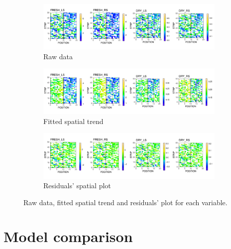 \begin{figure}
	\begin{subfigure}[t]{\textwidth}
		\centering
		\includegraphics[width = \textwidth]{../../Figures/BSS_rawData_plot.pdf}
		\caption{Raw data}
	\end{subfigure}
	
	\begin{subfigure}[t]{\textwidth}
		\centering
		\includegraphics[width = \textwidth]{../../Figures/BSS_FittedData_plot.pdf}
		\caption{Fitted spatial trend}
	\end{subfigure}
	
	\begin{subfigure}[t]{\textwidth}
		\centering
		\includegraphics[width = \textwidth]{../../Figures/BSS_residuals_plot.pdf}
		\caption{Residuals' spatial plot}
	\end{subfigure}
	\caption{Raw data, fitted spatial trend and residuals' plot for each variable.}
	\label{fig:spats_model_results}
\end{figure}



\section{Model comparison}

